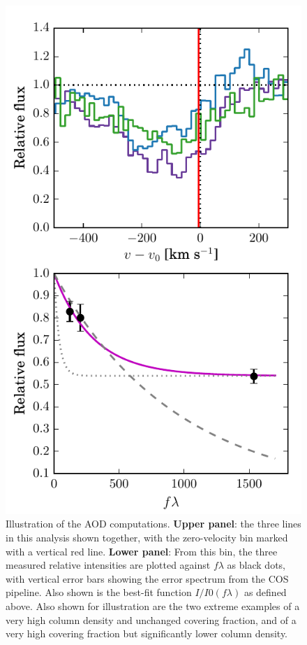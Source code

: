 \documentclass[twocolumn]{aastex61}
\begin{document}
\begin{figure}
\centering
\includegraphics[width=0.800\hsize]{./AOD-details-example.pdf}
\caption{Illustration of the AOD computations. \textbf{Upper panel}: the
three  lines in this analysis shown together, with the
zero-velocity bin marked with a vertical red line. \textbf{Lower panel}:
From this bin, the three measured relative intensities are plotted
against $f\lambda$ as black dots, with vertical error bars showing the
error spectrum from the COS pipeline. Also shown is the best-fit
function $I/I0 (f \lambda)$ as defined above. Also shown for
illustration are the two extreme examples of a very high column density
and unchanged covering fraction, and of a very high covering fraction
but significantly lower column density.}\label{fig:AOD}
\end{figure}
\end{document}
